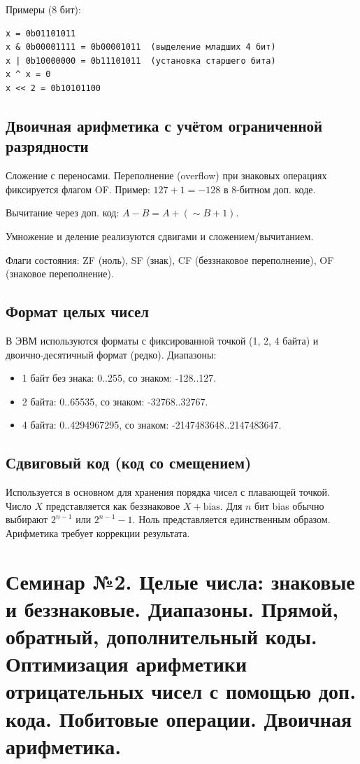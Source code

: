 \documentclass[a4paper,14pt]{report}
\begin{document}
Примеры (8 бит):
\begin{verbatim}
x = 0b01101011
x & 0b00001111 = 0b00001011  (выделение младших 4 бит)
x | 0b10000000 = 0b11101011  (установка старшего бита)
x ^ x = 0
x << 2 = 0b10101100
\end{verbatim}

\subsection{Двоичная арифметика с учётом ограниченной разрядности}
Сложение с переносами. Переполнение (overflow) при знаковых операциях фиксируется флагом OF. Пример: $127 + 1 = -128$ в 8-битном доп. коде.

Вычитание через доп. код: $A - B = A + (\sim B + 1)$.

Умножение и деление реализуются сдвигами и сложением/вычитанием.

Флаги состояния: ZF (ноль), SF (знак), CF (беззнаковое переполнение), OF (знаковое переполнение).

\subsection{Формат целых чисел}
В ЭВМ используются форматы с фиксированной точкой (1, 2, 4 байта) и двоично-десятичный формат (редко). Диапазоны:
\begin{itemize}
    \item 1 байт без знака: 0..255, со знаком: -128..127.
    \item 2 байта: 0..65535, со знаком: -32768..32767.
    \item 4 байта: 0..4294967295, со знаком: -2147483648..2147483647.
\end{itemize}

\subsection{Сдвиговый код (код со смещением)}
Используется в основном для хранения порядка чисел с плавающей точкой. Число $X$ представляется как беззнаковое $X + \text{bias}$. Для $n$ бит bias обычно выбирают $2^{n-1}$ или $2^{n-1}-1$. Ноль представляется единственным образом. Арифметика требует коррекции результата.

\section{Семинар №2. Целые числа: знаковые и беззнаковые. Диапазоны. Прямой, обратный, дополнительный коды. Оптимизация арифметики отрицательных чисел с помощью доп. кода. Побитовые операции. Двоичная арифметика.}
\end{document}
